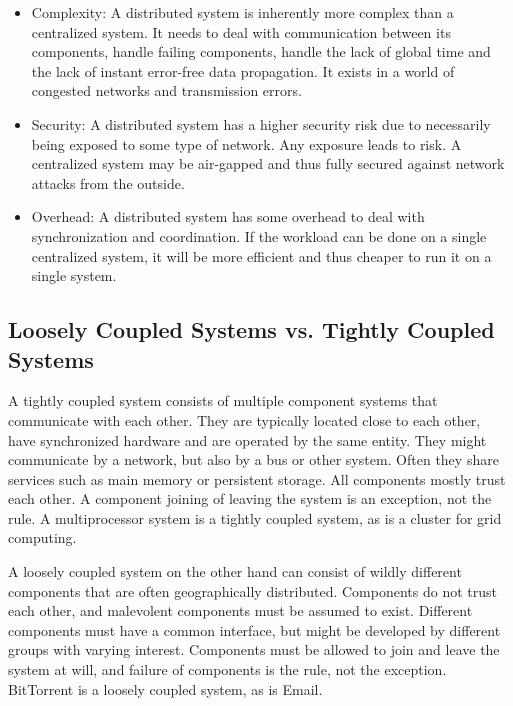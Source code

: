 \documentclass[a4paper]{article}
\begin{document}
\begin{itemize}

    \item Complexity: A distributed system is inherently more complex than a centralized system. It needs to deal with communication between its components, handle failing components, handle the lack of global time and the lack of instant error-free data propagation. It exists in a world of congested networks and transmission errors.

    \item Security: A distributed system has a higher security risk due to necessarily being exposed to some type of network. Any exposure leads to risk. A centralized system may be air-gapped and thus fully secured against network attacks from the outside.

    \item Overhead: A distributed system has some overhead to deal with synchronization and coordination. If the workload can be done on a single centralized system, it will be more efficient and thus cheaper to run it on a single system.

\end{itemize}

\subsection{Loosely Coupled Systems vs. Tightly Coupled Systems}

A tightly coupled system consists of multiple component systems that communicate with each other. They are typically located close to each other, have synchronized hardware and are operated by the same entity. They might communicate by a network, but also by a bus or other system. Often they share services such as main memory or persistent storage. All components mostly trust each other. A component joining of leaving the system is an exception, not the rule. A multiprocessor system is a tightly coupled system, as is a cluster for grid computing.

A loosely coupled system on the other hand can consist of wildly different components that are often geographically distributed. Components do not trust each other, and malevolent components must be assumed to exist. Different components must have a common interface, but might be developed by different groups with varying interest. Components must be allowed to join and leave the system at will, and failure of components is the rule, not the exception. BitTorrent is a loosely coupled system, as is Email.
\end{document}
